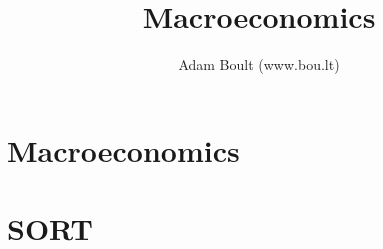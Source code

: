 \documentclass[oneside]{book}
\begin{document}
\author{Adam Boult (www.bou.lt)}
\title{Macroeconomics}
\maketitle

\setcounter{tocdepth}{0}
\tableofcontents



\part{Macroeconomics}








\part{SORT}

\end{document}
